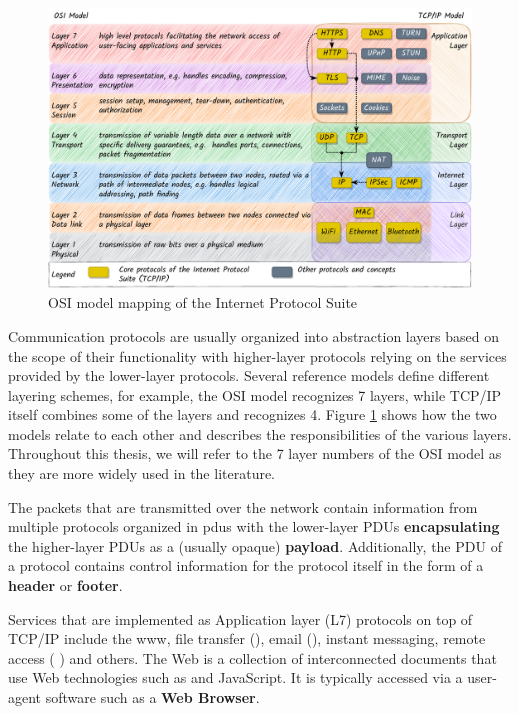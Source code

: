 \begin{figure}
\centering
\includegraphics[width=1\textwidth,height=\textheight]{thesis/../figures/osi-map-tcp.drawio.pdf}
\caption{OSI model mapping of the Internet Protocol Suite\label{osi-map-tcp}}
\end{figure}

Communication protocols are usually organized into abstraction layers based on the scope of their functionality with higher-layer protocols relying on the services provided by the lower-layer protocols. Several reference models define different layering schemes, for example, the OSI model recognizes 7 layers, while TCP/IP itself combines some of the layers and recognizes 4. Figure \ref{osi-map-tcp} shows how the two models relate to each other and describes the responsibilities of the various layers. Throughout this thesis, we will refer to the 7 layer numbers of the OSI model as they are more widely used in the literature.

The packets that are transmitted over the network contain information from multiple protocols organized in \glspl{pdu} with the lower-layer PDUs \textbf{encapsulating} the higher-layer PDUs as a (usually opaque) \textbf{payload}. Additionally, the PDU of a protocol contains control information for the protocol itself in the form of a \textbf{header} or \textbf{footer}.

Services that are implemented as Application layer (L7) protocols on top of TCP/IP include the \gls{www}, file transfer (), email (), instant messaging, remote access ( \autocite{sshRFC}) and others. The Web is a collection of interconnected documents that use Web technologies such as  and JavaScript. It is typically accessed via a user-agent software such as a \textbf{Web Browser}.

